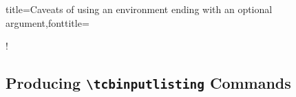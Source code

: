 \begin{dispListing*}{title={Caveats of using an environment ending with an
  optional argument},fonttitle=\bfseries}

\begin{mybox}[colframe=red]
\good
\end{mybox}

\begin{mybox}[colframe=red]\good\end{mybox}

\begin{mybox}
\good
\end{mybox}

\begin{mybox} \good\end{mybox}

\begin{mybox}\bad!\end{mybox}

\begin{mybox}
[\good]
\end{mybox}

\begin{mybox} [\good]\end{mybox}

\begin{mybox}[\bad!]\end{mybox}
\end{dispListing*}


\clearpage
\subsection{Producing \texttt{\textbackslash tcbinputlisting} Commands}\label{subsec:listings_inputlisting}
\enlargethispage*{1cm}

